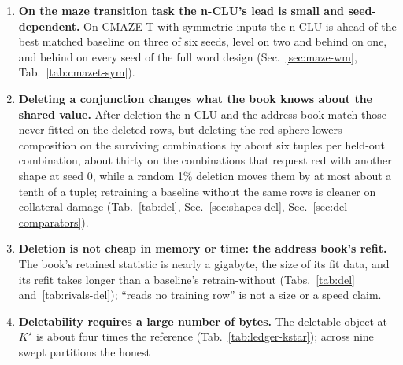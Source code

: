 \documentclass{article} %
\newcommand{\Kstar}{\ensuremath{K^{\star}}}
\begin{document}
\begin{enumerate}
\item \textbf{On the maze transition task the n-CLU's lead is small and seed-dependent.}
  On CMAZE-T with symmetric inputs the n-CLU is ahead of the best matched baseline on three of six seeds,
  level on two and behind on one, and behind on every seed of the full word design %
  (Sec.~\ref{sec:maze-wm}, Tab.~\ref{tab:cmazet-sym}).
\item \textbf{Deleting a conjunction changes what the book knows about the shared value.} After deletion
  the n-CLU and the address book match those never fitted on the deleted rows, but deleting the red
  sphere lowers composition on
  the surviving combinations by about six tuples per held-out combination, about thirty on the combinations that request red %
  with another shape at seed 0, while a random 1\% deletion moves them by at most about a tenth of a tuple; retraining a %
  baseline without the same rows is cleaner on collateral damage (Tab.~\ref{tab:del}, Sec.~\ref{sec:shapes-del},
  Sec.~\ref{sec:del-comparators}).
\item \textbf{Deletion is not cheap in memory or time: the address book's refit.} The book's retained statistic is nearly a gigabyte, %
  the size of its fit data, and its refit takes longer than a baseline's %
  retrain-without (Tabs.~\ref{tab:del} and~\ref{tab:rivals-del}); ``reads no training row'' is not a size or a speed claim.
\item \textbf{Deletability requires a large number of bytes.} The deletable object at $\Kstar$ is about four
  times the reference (Tab.~\ref{tab:ledger-kstar}); across nine swept partitions the honest

\end{enumerate}
\end{document}

